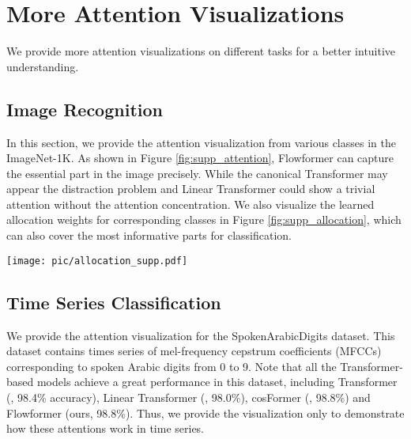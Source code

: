 \documentclass[nohyperref]{article}
\theoremstyle{plain}
\theoremstyle{definition}
\theoremstyle{remark}
\begin{document}
\section{More Attention Visualizations}

We provide more attention visualizations on different tasks for a better intuitive understanding.
\subsection{Image Recognition}
In this section, we provide the attention visualization from various classes in the ImageNet-1K. As shown in Figure \ref{fig:supp_attention}, Flowformer can capture the essential part in the image precisely. While the canonical Transformer \cite{NIPS2017_3f5ee243} may appear the distraction problem and Linear Transformer \cite{Katharopoulos2020TransformersAR} could show a trivial attention without the attention concentration. We also visualize the learned allocation weights for corresponding classes in Figure \ref{fig:supp_allocation}, which can also cover the most informative parts for classification.
\begin{figure*}[h]
\begin{center}
	\centerline{\texttt{[image: pic/allocation\_supp.pdf]}}
	\vspace{-5pt}
	\caption{Visualization of learned allocation weights  of Flowformer. }
	\label{fig:supp_allocation}
\end{center}
\vspace{-25pt}
\end{figure*}

\subsection{Time Series Classification}\label{appdix:ts_vis}

We provide the attention visualization for the SpokenArabicDigits dataset. This dataset contains times series of mel-frequency cepstrum coefficients (MFCCs) corresponding to spoken Arabic digits from 0 to 9. Note that all the Transformer-based models achieve a great performance in this dataset, including Transformer (\citealt{NIPS2017_3f5ee243}, 98.4\% accuracy), Linear Transformer (\citealt{Katharopoulos2020TransformersAR}, 98.0\%), cosFormer (\citealt{anonymous2022cosformer}, 98.8\%) and Flowformer (ours, 98.8\%). Thus, we provide the visualization only to demonstrate how these attentions work in time series.
\end{document}
